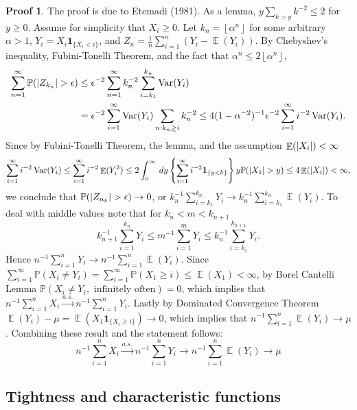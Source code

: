 \documentclass[hidelinks,11pt]{article}
\theoremstyle{definition}
\theoremstyle{dotless}
\newtheorem{prop}{Proof}[section]
\theoremstyle{remark}
\DeclareMathOperator{\Var}{Var}
\DeclareMathOperator{\E}{\mathbb{E}}
\DeclareMathOperator{\1}{\mathbf{1}}
\begin{document}
\begin{prop}
The proof is due to Etemadi (1981). As a lemma, $y\sum_{k>y}k^{-2}\leq2$ for $y\geq0$.\smallbreak
Assume for simplicity that $X_i\geq0$. Let $k_n=\left\lfloor{\alpha^n}\right\rfloor$ for some arbitrary $\alpha>1$, $Y_i=X_i\textbf{1}_{\{X_i<i\}}$, and $Z_n=\frac{1}{n}\sum_{i=1}^n(Y_i-\E(Y_i))$.\smallbreak
By Chebyshev's inequality,  Fubini-Tonelli Theorem, and the fact that $\alpha^n\leq2\left\lfloor{\alpha^n}\right\rfloor$,
\begin{align*}
\sum_{n=1}^\infty\mathbb{P}(\abs{Z_{k_n}}>\epsilon)&\leq\epsilon^{-2}\sum_{n=1}^\infty k_n^{-2}\sum_{i=k_1}^{k_n}\Var(Y_i)\\
&=\epsilon^{-2}\sum_{i=1}^\infty\Var(Y_i)\sum_{n:k_n\geq i}k_n^{-2}\leq4(1-\alpha^{-2})^{-1}\epsilon^{-2}\sum_{i=1}^\infty i^{-2}\Var(Y_i).
\end{align*}
Since by Fubini-Tonelli Theorem, the lemma, and the assumption $\E(\abs{X_i})<\infty$
\[\sum_{i=1}^\infty i^{-2}\Var(Y_i)\leq\sum_{i=1}^\infty i^{-2}\E(Y_i^2)\leq2\int_0^\infty\,dy\left\{\sum_{i=1}^\infty i^{-2}\textbf{1}_{\{y<k\}}\right\}y\mathbb{P}(\abs{X_1}>y)\leq4\E(\abs{X_i})<\infty,\]
we conclude that $\mathbb{P}(\abs{Z_{n_k}}>\epsilon)\to0$, or $k_n^{-1}\sum_{i=k_1}^{k_n}Y_i\to k_n^{-1}\sum_{i=k_1}^{k_n}\E(Y_i)$. To deal with middle values note that for $k_n<m<k_{n+1}$
\[k_{n+1}^{-1}\sum_{i=1}^{k_n}Y_i\leq m^{-1}\sum_{i=1}^mY_i\leq k_n^{-1}\sum_{i=k_1}^{k_{n+1}}Y_i.\]
Hence $n^{-1}\sum_{i=1}^nY_i\to n^{-1}\sum_{i=1}^n\E(Y_i)$.\smallbreak
Since $\sum_{i=1}^\infty\mathbb{P}(X_i\neq Y_i)=\sum_{i=1}^\infty\mathbb{P}(X_1\geq i)\leq\E(X_1)<\infty$, by Borel Cantelli Lemma $\mathbb{P}(X_i\neq Y_i,\textrm{ infinitely often})=0$, which implies that $n^{-1}\sum_{i=1}^nX_i\xrightarrow{a.s.}n^{-1}\sum_{i=1}^nY_i$.\smallbreak
Lastly by Dominated Convergence Theorem $\E(Y_i)-\mu=\E(X_1\textbf{1}_{\{X_i\geq i\}})\to0$, which implies that $n^{-1}\sum_{i=1}^n\E(Y_i)\to\mu$. Combining these result and the statement follows:
\[n^{-1}\sum_{i=1}^nX_i\xrightarrow{a.s.}n^{-1}\sum_{i=1}^nY_i\to n^{-1}\sum_{i=1}^n\E(Y_i)\to\mu\]
\end{prop}

\subsection{Tightness and characteristic functions}
\end{document}
